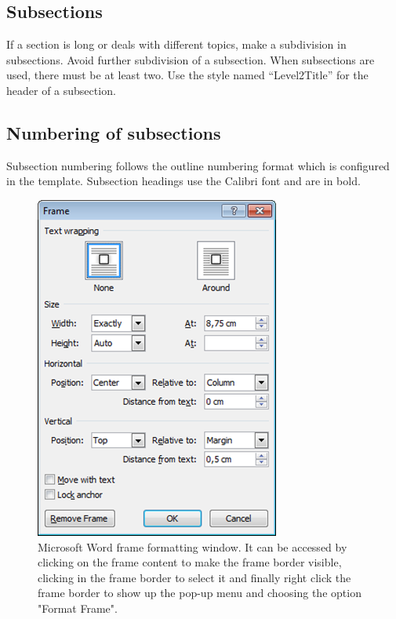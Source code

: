 \documentclass[10pt]{imeko_acta}
\begin{document}
\subsection{Subsections} \label{sec:sub1}

If a section is long or deals with different topics, make a subdivision in subsections. Avoid further subdivision of a subsection. When subsections are used, there must be at least two. Use the style named ``Level2Title'' for the header of a subsection.

\subsection{Numbering of subsections}

Subsection numbering follows the outline numbering format which is configured in the template. Subsection headings use the Calibri font and are in bold.


\begin{figure}[!b]
	\centering
	\includegraphics[width=.9\columnwidth]{image2}
	\caption{Microsoft Word frame formatting window. It can be accessed by clicking on the frame content to make the frame border visible, clicking in the frame border to select it and finally right click the frame border to show up the pop-up menu and choosing the option "Format Frame".}
	\label{fig:image2}
\end{figure}
\end{document}
